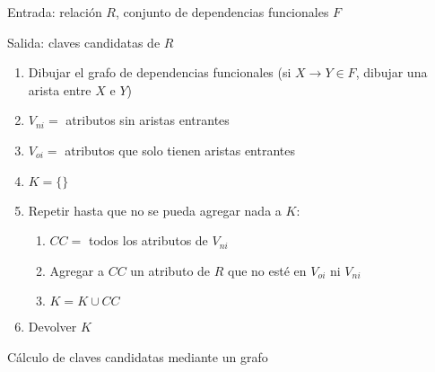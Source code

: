 \documentclass[a4paper, twoside]{article}
\begin{document}
\begin{algorithm}[H]
	Entrada: relación $R$, conjunto de dependencias funcionales $F$

	Salida: claves candidatas de $R$
	\begin{enumerate}
		\item Dibujar el grafo de dependencias funcionales (si $X\to Y\in F$, dibujar una arista entre $X$ e $Y$)
		\item $V_{ni}=$ atributos sin aristas entrantes
		\item $V_{oi}=$ atributos que solo tienen aristas entrantes
		\item $K=\{\}$
		\item Repetir hasta que no se pueda agregar nada a $K$:
		\begin{enumerate}
			\item $CC=$ todos los atributos de $V_{ni}$
			\item Agregar a $CC$ un atributo de $R$ que no esté en $V_{oi}$ ni $V_{ni}$
			\item $K=K\cup CC$
		\end{enumerate}
		\item Devolver $K$
	\end{enumerate}
	\caption{Cálculo de claves candidatas mediante un grafo}
\end{algorithm}
\end{document}
